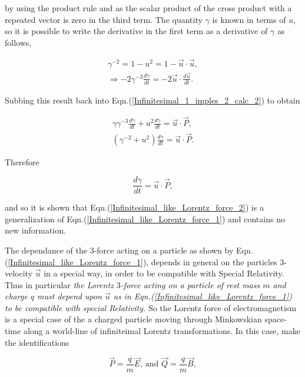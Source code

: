 \noindent by using the product rule and as the scalar product of the cross product with a repeated vector is zero in the third term. The quantity $\gamma$ is known in terms of $u$, so it is possible to write the derivative in the first term as a derivative of $\gamma$ as follows,

\begin{eqnarray*} 
\gamma^{-2} = 1 - u^{2} = 1- \vec{u} \cdot \vec{u}, \\
\Rightarrow -2 \gamma^{-3} \frac{d\gamma}{dt} = - 2 \vec{u} \cdot \frac{d \vec{u}}{dt}.
\end{eqnarray*}

\noindent Subbing this result back into Eqn.(\ref{Infinitesimal_1_imples_2_calc_2}) to obtain

\begin{eqnarray*} 
\gamma \gamma^{-3} \frac{d\gamma}{dt} + u^2 \frac{d\gamma}{dt} = \vec{u} \cdot \vec{P}, \\
(\gamma^{-2} + u^2) \frac{d\gamma}{dt} = \vec{u} \cdot \vec{P}.
\end{eqnarray*} 

Therefore

\begin{equation*}
\frac{d\gamma}{dt} =  \vec{u} \cdot \vec{P},
\end{equation*}

and so it is shown that Eqn.(\ref{Infinitesimal_like_Lorentz_force_2}) is a generalization of Eqn.(\ref{Infinitesimal_like_Lorentz_force_1}) and contains no new information. 

The dependance of the $3$-force acting on a particle as shown by Eqn.(\ref{Infinitesimal_like_Lorentz_force_1}), depends in general on the particles $3$-velocity $\vec{u}$ in a special way, in order to be compatible with Special Relativity. Thus in particular \textit{the Lorentz $3$-force acting on a particle of rest mass $m$ and charge $q$ must depend upon $\vec{u}$ as in Eqn.(\ref{Infinitesimal_like_Lorentz_force_1}) to be compatible with special Relativity.} So the Lorentz force of electromagnetism is a special case of the a charged particle moving through Minkowskian space-time along a world-line of infiniteimal Lorentz transformations. In this case, make the identifications

\begin{equation}\label{Infinitesimal_P_Q_interms_E_B} 
\vec{P} = \frac{q}{m} \vec{E} \text{, and  } \vec{Q} = \frac{q}{m}\vec{B},
\end{equation} 


